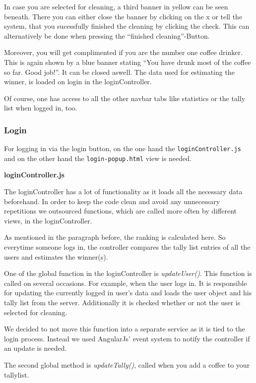 In case you are selected for cleaning, a third banner in yellow can be
seen beneath. There you can either close the banner by clicking on the x
or tell the system, that you sucessfully finished the cleaning by
clicking the check. This can alternatively be done when pressing the
``finished cleaning''-Button.

Moreover, you will get complimented if you are the number one coffee
drinker. This is again shown by a blue banner stating ``You have drunk
most of the coffee so far. Good job!''. It can be closed aswell. The
data used for estimating the winner, is loaded on login in the
loginController.

Of course, one has access to all the other navbar tabs like statistics
or the tally list when logged in, too.

\subsubsection{Login}\label{login}

For logging in via the login button, on the one hand the
\texttt{loginController.js} and on the other hand the
\texttt{login-popup.html} view is needed.

\textbf{loginController.js}

The loginController has a lot of functionality as it loads all the
necessary data beforehand. In order to keep the code clean and avoid any
unnecessary repetitions we outsourced functions, which are called more
often by different views, in the loginController.

As mentioned in the paragraph before, the ranking is calculated here. So
everytime someone logs in, the controller compares the tally list
entries of all the users and estimates the winner(s).

One of the global function in the loginController is
\emph{updateUser()}. This function is called on several occasions. For
example, when the user logs in. It is responsible for updating the
currently logged in user's data and loads the user object and his tally
list from the server. Additionally it is checked whether or not the user
is selected for cleaning.

We decided to not move this function into a separate service as it is
tied to the login process. Instead we used AngularJs' event system to
notify the controller if an update is needed.

The second global method is \emph{updateTally()}, called when you add a
coffee to your tallylist.

